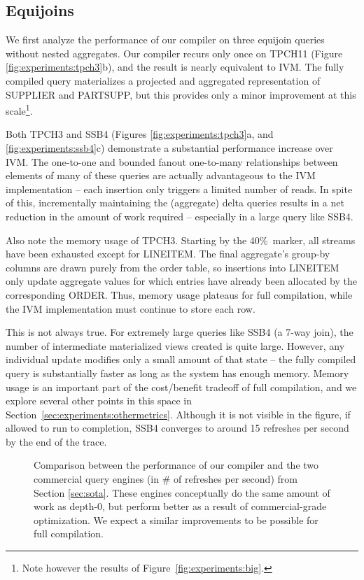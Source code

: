 \subsection{Equijoins}

We first analyze the performance of our compiler on three equijoin queries without nested aggregates.  Our compiler recurs only once on TPCH11 (Figure \ref{fig:experiments:tpch3}b), and the result is nearly equivalent to IVM.  The fully compiled query materializes a projected and aggregated representation of SUPPLIER and PARTSUPP, but this provides only a minor improvement at this scale\footnote{Note however the results of Figure~\ref{fig:experiments:big}.}.  

Both TPCH3 and SSB4 (Figures \ref{fig:experiments:tpch3}a, and \ref{fig:experiments:ssb4}c) demonstrate a substantial performance increase over IVM.  The one-to-one and bounded fanout one-to-many relationships between elements of many of these queries are actually advantageous to the IVM implementation -- each insertion only triggers a limited number of reads.  In spite of this, incrementally maintaining the (aggregate) delta queries results in a net reduction in the amount of work required -- especially in a large query like SSB4.

Also note the memory usage of TPCH3.  Starting by the 40\%\ marker, all streams have been exhausted except for LINEITEM.  The final aggregate's group-by columns are drawn purely from the order table, so insertions into LINEITEM only update aggregate values for which entries have already been allocated by the corresponding ORDER.  Thus, memory usage plateaus for full compilation, while the IVM implementation must continue to store each row.

This is not always true.  For extremely large queries like SSB4 (a 7-way join), the number of intermediate materialized views created is quite large.  However, any individual update modifies only a small amount of that state -- the fully compiled query is substantially faster as long as the system has enough memory.    Memory usage is an important part of the cost/benefit tradeoff of full compilation, and we explore several other points in this space in Section~\ref{sec:experiments:othermetrics}.  Although it is not visible in the figure, if allowed to run to completion, SSB4 converges to around 15 refreshes per second by the end of the trace.
\begin{figure}
\begin{center}
\resizebox{3.3in}{!}{

}
\caption{Comparison between the performance of our compiler and the two commercial query engines (in \# of refreshes per second) from Section \ref{sec:sota}.  These engines conceptually do the same amount of work as depth-0, but perform better as a result of commercial-grade optimization.  We expect a similar improvements to be possible for full compilation.}
\label{fig:experiments:enginesVsDBT}
\vspace*{-0.3in}
\end{center}
\end{figure}

